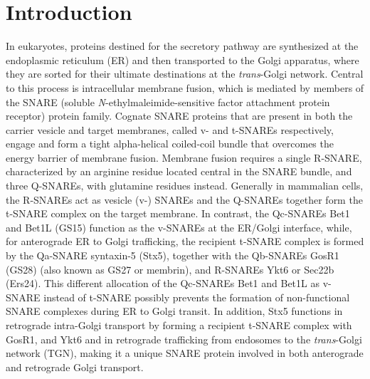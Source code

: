 \section{Introduction}

In eukaryotes, proteins destined for the secretory pathway are synthesized at the endoplasmic reticulum (ER) and then transported to the Golgi apparatus, where they are sorted for their ultimate destinations at the \emph{trans}-Golgi network. Central to this process is intracellular membrane fusion, which is mediated by members of the SNARE (soluble \emph{N}-ethylmaleimide-sensitive factor attachment protein receptor) protein family. Cognate SNARE proteins that are present in both the carrier vesicle and target membranes, called v- and t-SNAREs respectively, engage and form a tight alpha-helical coiled-coil bundle that overcomes the energy barrier of membrane fusion. Membrane fusion requires a single R-SNARE, characterized by an arginine residue located central in the SNARE bundle, and three Q-SNAREs, with glutamine residues instead. Generally in mammalian cells, the R-SNAREs act as vesicle (v-) SNAREs and the Q-SNAREs together form the t-SNARE complex on the target membrane\cite{jahn_snares_2006}. In contrast, the Qc-SNAREs Bet1 and Bet1L (GS15) function as the v-SNAREs at the ER/Golgi interface\cite{banfield_snare-like_1995,parlati_topological_2000,parlati_distinct_2002,xu_gs15_2002}, while, for anterograde ER to Golgi trafficking, the recipient t-SNARE complex is formed by the Qa-SNARE syntaxin-5 (Stx5)\cite{bentley_snare_2006,dascher_syntaxin_1994,rowe_role_1998,xu_subunit_2000}, together with the Qb-SNAREs GosR1 (GS28) (also known as GS27 or membrin), and R-SNAREs Ykt6 or Sec22b (Ers24)\cite{hay_localization_1998,paek_ers-24_1997,zhang_ykt6_2001}. This different allocation of the Qc-SNAREs Bet1 and Bet1L as v-SNARE instead of t-SNARE possibly prevents the formation of non-functional SNARE complexes during ER to Golgi transit. In addition, Stx5 functions in retrograde intra-Golgi transport by forming a recipient t-SNARE complex with GosR1, and Ykt6\cite{xu_gs15_2002,linders_stx5-mediated_2019} and in retrograde trafficking from endosomes to the \emph{trans}-Golgi network (TGN)\cite{malsam_organization_2011,tai_participation_2004}, making it a unique SNARE protein involved in both anterograde and retrograde Golgi transport.

